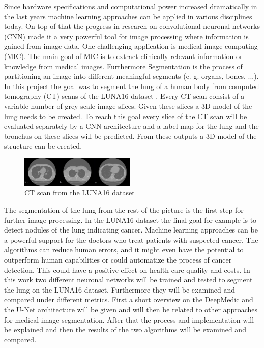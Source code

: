 
Since hardware specifications and computational power increased dramatically in the last years machine learning approaches can be applied in various disciplines today. On top of that the progress in research on convolutional neuronal networks (CNN) made it a very powerful tool for image processing where information is gained from image data.\newline
One challenging application is medical image computing (MIC). The main goal of MIC is to extract clinically relevant information or knowledge from medical images. Furthermore Segmentation is the process of partitioning an image into different meaningful segments (e. g. organs, bones, ...).\newline
In this project the goal was to segment the lung of a human body from computed tomography (CT) scans of the LUNA16 dataset \cite{luna}. Every CT scan consist of a variable number of grey-scale image slices. Given these slices a 3D model of the lung needs to be created. To reach this goal every slice of the CT scan will be evaluated separately by a CNN architecture and a label map for the lung and the bronchus on these slices will be predicted. From these outputs a 3D model of the structure can be created. \newline

\begin{figure}[h!]
	\includegraphics[width=0.49\textwidth, angle=0]{files/ctscans.jpg}
	\caption{CT scan from the LUNA16 dataset}
	\label{scan_picture}
\end{figure}

The segmentation of the lung from the rest of the picture is the first step for further image processing. In the LUNA16 dataset the final goal for example is to detect nodules of the lung indicating cancer. Machine learning approaches can be a powerful support for the doctors who treat patients with suspected cancer. The algorithms can reduce human errors, and it might even have the potential to outperform human capabilities or could automatize the process of cancer detection. This could have a positive effect on health care quality and costs.\newline
In this work two different neuronal networks will be trained and tested to segment the lung on the LUNA16 dataset. Furthermore they will be examined and compared under different metrics.\newline
First a short overview on the DeepMedic and the U-Net architecture will be given and will then be related to other approaches for medical image segmentation. After that the process and implementation will be explained and then the results of the two algorithms will be examined and compared.
